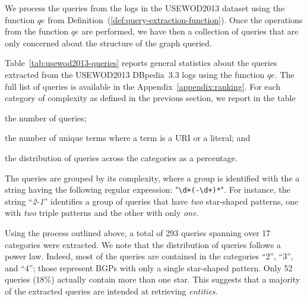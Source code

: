 We process the queries from the logs in the USEWOD2013 dataset using the function $qe$ from Definition~(\ref{def:query-extraction-function}).
Once the operations from the function $qe$ are performed, we have then a collection of queries that are only concerned about the structure of the graph queried.

Table~\ref{tab:usewod2013-queries} reports general statistics about the queries extracted from the USEWOD2013 DBpedia~3.3 logs using the function $qe$. The full list of queries is available in the Appendix~\ref{appendix:ranking}. For each category of complexity as defined in the previous section, we report in the table
\begin{inparaenum}[(a)]
\item the number of queries;
\item the number of unique terms where a term is a URI or a literal; and
\item the distribution of queries across the categories as a percentage.
\end{inparaenum}

The queries are grouped by its complexity, where a group is identified with the a string having the following regular expression: "\verb/\d+(-\d+)*/". For instance, the string ``\emph{2-1}'' identifies a group of queries that have \textit{two} star-shaped patterns, one with \textit{two} triple patterns and the other with only \textit{one}.

Using the process outlined above, a total of 293 queries spanning over 17 categories were extracted. We note that the distribution of queries follows a power law. Indeed, most of the queries are contained in the categories ``2'', ``3'', and ``4''; those represent BGPs with only a single star-shaped pattern. Only 52 queries (18\%) actually contain more than one star. This suggests that a majority of the extracted queries are intended at retrieving \emph{entities}.


